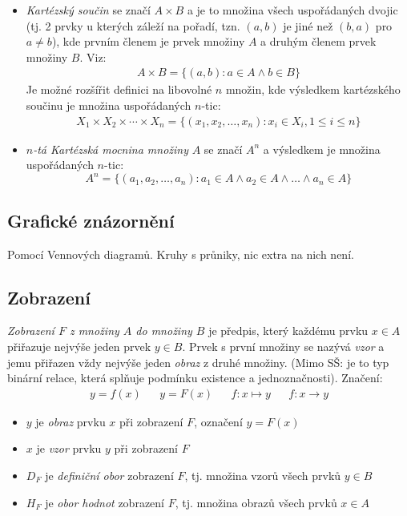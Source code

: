 \documentclass[12pt]{article}
\begin{document}
\begin{itemize}
\item \emph{Kartézský součin} se značí $A \times B$ a je to množina všech uspořádaných dvojic (tj. 2 prvky u kterých záleží na pořadí, tzn. $(a,b)$ je jiné než $(b, a)$ pro $a \neq b$), kde prvním členem je prvek množiny $A$ a druhým členem prvek množiny $B$. Viz:
\begin{align}
A \times B = \{ (a,b): a \in A \land b \in B \}
\end{align}
Je možné rozšířit definici na libovolné $n$ množin, kde výsledkem kartézského součinu je množina uspořádaných $n$-tic:
\begin{align}
 X_{1}\times X_{2}\times \dotsm \times X_{n}=\{(x_{1},x_{2},\dotsc ,x_{n}):x_{i}\in X_{i},1\leq i\leq n\}
\end{align}
\item \emph{$n$-tá Kartézská mocnina množiny} $A$ se značí $A^n$ a výsledkem je množina uspořádaných $n$-tic:
\begin{equation}
A^n = \{ \left(a_1, a_2, \dotsc, a_n \right): a_1 \in A \land a_2 \in A \land \dotso \land a_n \in A \}
\end{equation}

\end{itemize}
\subsection{Grafické znázornění}
Pomocí Vennových diagramů. Kruhy s průniky, nic extra na nich není.
\subsection{Zobrazení}
\emph{Zobrazení $F$ z množiny $A$ do množiny $B$} je předpis, který každému prvku $ x \in A$ přiřazuje nejvýše jeden prvek $y \in B$. Prvek s první množiny se nazývá \emph{vzor} a jemu přiřazen vždy nejvýše jeden \emph{obraz} z druhé množiny. (Mimo SŠ: je to typ binární relace, která splňuje podmínku existence a jednoznačnosti). Značení:
\begin{align}
y = f(x) && y = F(x) && f: x \mapsto y && f: x \to y
\end{align}
\begin{itemize}
\item $y$ je \emph{obraz} prvku $x$ při zobrazení $F$, označení $y =F(x)$
\item $x$ je \emph{vzor} prvku $y$ při zobrazení $F$
\item $D_F$ je \emph{definiční obor} zobrazení $F$, tj. množina vzorů všech prvků $ y \in B$
\item $H_F$ je \emph{obor hodnot} zobrazení $F$, tj. množina obrazů všech prvků $ x \in A$ 
\end{itemize}
\end{document}
